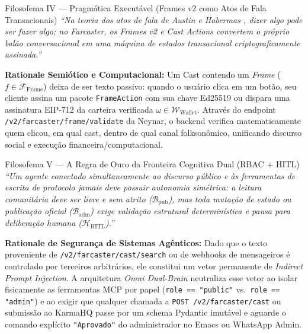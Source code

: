 \documentclass[11pt,a4paper]{article}
\begin{document}
\begin{filosofema}{Filosofema IV --- Pragmática Executável (Frames v2 como Atos de Fala Transacionais)}
\emph{``Na teoria dos atos de fala de Austin e Habermas \cite{habermas1981teoria}, dizer algo pode ser fazer algo; no Farcaster, os Frames v2 e Cast Actions convertem o próprio balão conversacional em uma máquina de estados transacional criptograficamente assinada.''}

\medskip
\noindent\textbf{Rationale Semiótico e Computacional:}
Um Cast contendo um \emph{Frame} ($f \in \mathcal{F}_{\text{Frame}}$) deixa de ser texto passivo: quando o usuário clica em um botão, seu cliente assina um pacote \texttt{FrameAction} com sua chave Ed25519 ou dispara uma assinatura EIP-712 da carteira verificada $\omega \in \mathcal{W}_{\text{Wallet}}$. Através do endpoint \texttt{/v2/farcaster/frame/validate} da Neynar, o backend verifica matematicamente quem clicou, em qual cast, dentro de qual canal folksonômico, unificando discurso social e execução financeira/computacional.
\end{filosofema}

\begin{filosofema}{Filosofema V --- A Regra de Ouro da Fronteira Cognitiva Dual (RBAC + HITL)}
\emph{``Um agente conectado simultaneamente ao discurso público e às ferramentas de escrita de protocolo jamais deve possuir autonomia simétrica: a leitura comunitária deve ser livre e sem atrito ($\mathcal{B}_{\text{pub}}$), mas toda mutação de estado ou publicação oficial ($\mathcal{B}_{\text{adm}}$) exige validação estrutural determinística e pausa para deliberação humana ($\mathcal{H}_{\text{HITL}}$).''}

\medskip
\noindent\textbf{Rationale de Segurança de Sistemas Agênticos:}
Dado que o texto proveniente de \texttt{/v2/farcaster/cast/search} ou de webhooks de mensageiros é controlado por terceiros arbitrários, ele constitui um vetor permanente de \emph{Indirect Prompt Injection}. A arquitetura \emph{Omni Dual-Brain} neutraliza esse vetor ao isolar fisicamente as ferramentas MCP por papel (\texttt{role == "public"} vs.\ \texttt{role == "admin"}) e ao exigir que qualquer chamada a \texttt{POST /v2/farcaster/cast} ou submissão ao KarmaHQ passe por um schema Pydantic imutável e aguarde o comando explícito \texttt{"Aprovado"} do administrador no Emacs ou WhatsApp Admin.
\end{filosofema}
\end{document}
